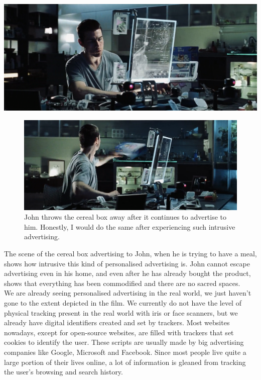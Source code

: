 \documentclass[11pt]{article}
\begin{document}
\begin{center}
\includegraphics[width=.9\linewidth]{./images/cereal-box-advertising-to-john.png}
\end{center}

\begin{figure}[htbp]
\centering
\includegraphics[width=.9\linewidth]{./images/john-throwing-the-cereal-box-away.png}
\caption{John throws the cereal box away after it continues to advertise to him. Honestly, I would do the same after experiencing such intrusive advertising.}
\end{figure}

 \newpage

The scene of the cereal box advertising to John, when he is trying to
have a meal, shows how intrusive this kind of personalised
advertising is. John cannot escape advertising even in
his home, and even after he has already bought the product, shows
that everything has been commodified and there are
no sacred spaces.  \\

We are already seeing personalised advertising in the real
world, we just haven't gone to the extent depicted in the film.
We currently do not have the level of physical tracking present
in the real world with iris or face scanners, but we already have
digital identifiers created and set by trackers.
Most websites nowadays, except for open-source websites, are filled with
trackers that set cookies to identify the user. These scripts are usually
made by big advertising companies like Google, Microsoft and Facebook.
Since most people live quite a large portion of their lives online,
a lot of information is gleaned from tracking the user's
browsing and search history.  \\
\end{document}
